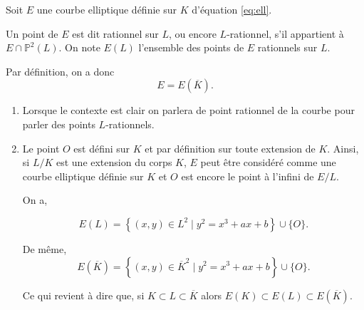 Soit $E$ une courbe elliptique définie sur $K$ d'équation \eqref{eq:ell}.

\begin{definition}
    Un point de $E$ est dit rationnel sur $L$, ou encore $L$-rationnel, s'il appartient à $E \cap \mathbb{P}^2(L)$. On note $E(L)$ l'ensemble des points de $E$ rationnels sur $L$.
\end{definition}

Par définition, on a donc
\[
E = E(\overline{K})
.\] 

\begin{remarque}
    \begin{enumerate}
        \item  Lorsque le contexte est clair on parlera de point rationnel de la courbe pour
            parler des points $L$-rationnels.
        \item Le point $O$ est défini sur $K$ et par définition sur toute
            extension de $K$. Ainsi, si $L / K$ est une extension du corps $K$, $E$
            peut être considéré comme une courbe elliptique définie sur $K$ et $O$
            est encore le point à l'infini de $E / L$.

            On a,

            \[
            E(L) = \left\{ (x,y) \in L^2 \mid y^2 = x^3 + ax + b \right\} \cup \{O\}
            .\] 

            De même,
            \[
            E(\overline{K}) = \left\{ (x,y) \in \overline{K}^2 \mid y^2 = x^3 +
            ax + b \right\} \cup \{O\}
            .\] 

            Ce qui revient à dire que, si $K \subset L \subset \overline{K}$ alors $E(K)
            \subset E(L) \subset E(\overline{K})$.
    \end{enumerate}
\end{remarque}

